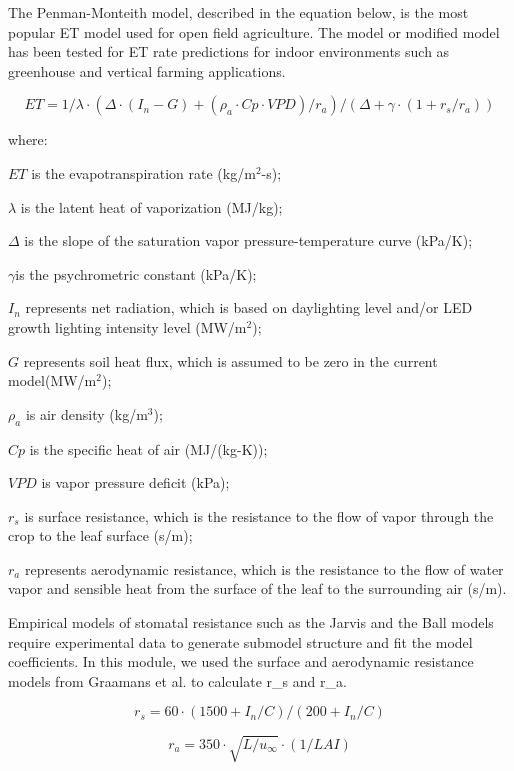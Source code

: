 The Penman-Monteith model, described in the equation below,  is the most popular ET model used for open field agriculture. The model or modified model has been tested for ET rate predictions for indoor environments such as greenhouse and vertical farming applications. 

\begin{equation}
ET=1/\lambda \cdot (\Delta \cdot(I_n-G)+(\rho_a \cdot Cp \cdot VPD)/r_a )/(\Delta+\gamma \cdot (1+r_s/r_a ) )
\end{equation}

where:

\(ET\) is the evapotranspiration rate (kg/m\(^2\)-s);
 
\(\lambda\) is the latent heat of vaporization (MJ/kg); 

\(\Delta\) is the slope of the saturation vapor pressure-temperature curve (kPa/K); 

\(\gamma\)is the psychrometric constant (kPa/K);

\(I_n\) represents net radiation, which is based on daylighting level and/or LED growth lighting intensity level (MW/m\(^2\));

\(G\) represents soil heat flux, which is assumed to be zero in the current model(MW/m\(^2\));

\(\rho_a\) is air density (kg/m\(^3\));

\(Cp\) is the specific heat of air (MJ/(kg-K));

\(VPD\) is vapor pressure deficit (kPa);

\(r_s\) is surface resistance, which is the resistance to the flow of vapor through the crop to the leaf surface (s/m); 

\(r_a\) represents aerodynamic resistance, which is the resistance to the flow of water vapor and sensible heat from the surface of the leaf to the surrounding air (s/m).

Empirical models of stomatal resistance such as the Jarvis and the Ball models require experimental data to generate submodel structure and fit the model coefficients.  In this module, we used the surface and aerodynamic resistance models from Graamans et al. to calculate r_s and r_a. 

\begin{equation}
r_s=60 \cdot (1500+I_n/C)/(200+I_n/C) 
\end{equation}

\begin{equation}
r_a=350 \cdot \sqrt{L/u_\infty} \cdot (1/LAI)
\end{equation}

